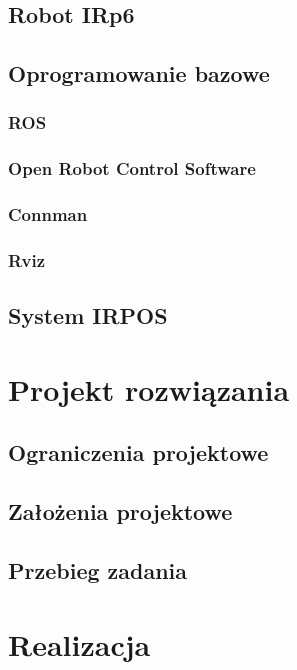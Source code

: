 \documentclass[11pt, a4paper, openright]{report}
\begin{document}
	\section{Robot IRp6}
	\label{s:robot_irp6}
	\section{Oprogramowanie bazowe}
	\label{s:oprogramowanie_baz}
		\subsection{ROS}
		\label{ss:ros2}
		\subsection{Open Robot Control Software }
		\label{ss:orocos}
		\subsection{Connman}
		\label{ss:connman}
		\subsection{Rviz}
		\label{ss:rviz}
	\section{System IRPOS}
	\label{s:irpos}
		
\chapter{Projekt rozwiązania}
\label{ch:projekt_rozwiazania}
	\section{Ograniczenia projektowe}
	\label{s:ograniczenia}
	\section{Założenia projektowe}
	\label{s:zalozenia}
	\section{Przebieg zadania}
	\label{s:przebieg}
	
\chapter{Realizacja}
\label{ch:realizacja}
\end{document}

